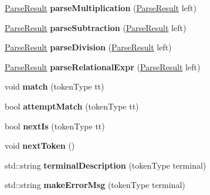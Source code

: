 \begin{DoxyCompactItemize}
\item 
\hypertarget{classParser_a52e6a57d53fc98e5819cc51b3cbe5bd5}{\hyperlink{classParseResult}{Parse\-Result} {\bfseries parse\-Multiplication} (\hyperlink{classParseResult}{Parse\-Result} left)}\label{classParser_a52e6a57d53fc98e5819cc51b3cbe5bd5}

\item 
\hypertarget{classParser_ac22cf1f77e0ca4c23942d5cbcc47eb37}{\hyperlink{classParseResult}{Parse\-Result} {\bfseries parse\-Subtraction} (\hyperlink{classParseResult}{Parse\-Result} left)}\label{classParser_ac22cf1f77e0ca4c23942d5cbcc47eb37}

\item 
\hypertarget{classParser_ad05e6cd1bf83179ecb727b83cbbd0c4e}{\hyperlink{classParseResult}{Parse\-Result} {\bfseries parse\-Division} (\hyperlink{classParseResult}{Parse\-Result} left)}\label{classParser_ad05e6cd1bf83179ecb727b83cbbd0c4e}

\item 
\hypertarget{classParser_ab42ecabc4dbe601d5ed9667351c0c0b8}{\hyperlink{classParseResult}{Parse\-Result} {\bfseries parse\-Relational\-Expr} (\hyperlink{classParseResult}{Parse\-Result} left)}\label{classParser_ab42ecabc4dbe601d5ed9667351c0c0b8}

\item 
\hypertarget{classParser_a3199aab5275c8b6477245eb866fabf35}{void {\bfseries match} (token\-Type tt)}\label{classParser_a3199aab5275c8b6477245eb866fabf35}

\item 
\hypertarget{classParser_a151ffb920a67527813d77bc4ba44c4a7}{bool {\bfseries attempt\-Match} (token\-Type tt)}\label{classParser_a151ffb920a67527813d77bc4ba44c4a7}

\item 
\hypertarget{classParser_a67a10b685bd263477b5f59f1923cdec3}{bool {\bfseries next\-Is} (token\-Type tt)}\label{classParser_a67a10b685bd263477b5f59f1923cdec3}

\item 
\hypertarget{classParser_a324a5bb61c9dfc645300a92aecd6fe69}{void {\bfseries next\-Token} ()}\label{classParser_a324a5bb61c9dfc645300a92aecd6fe69}

\item 
\hypertarget{classParser_af65b651dfccdd3644c27ec5ae3e82b9d}{std\-::string {\bfseries terminal\-Description} (token\-Type terminal)}\label{classParser_af65b651dfccdd3644c27ec5ae3e82b9d}

\item 
\hypertarget{classParser_a72a0ed0baf243132fc4656c89bddc852}{std\-::string {\bfseries make\-Error\-Msg} (token\-Type terminal)}\label{classParser_a72a0ed0baf243132fc4656c89bddc852}


\end{DoxyCompactItemize}

